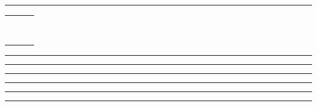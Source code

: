 
\hfill{\bfseries\Huge\MyYear}\par
\nointerlineskip\vspace{0.5em}
\rule{\textwidth}{1pt}

\nointerlineskip\vspace{0.5em}

\begin{tabular*}{\textwidth}{@{}>{\bfseries}c@{\extracolsep\fill}>{\bfseries}c@{\extracolsep\fill}>{\bfseries}c@{}}
	\MonthNameRowYC{\January}{\February}{\March}    \\
	\MonthTblYC{\MonthTblJan}  & \MonthTblYC{\MonthTblFeb}  & \MonthTblYC{\MonthTblMar} \\
	\MonthNameRowYC{\April}{\May}{\June}            \\
	\MonthTblYC{\MonthTblApr}  & \MonthTblYC{\MonthTblMay}  & \MonthTblYC{\MonthTblJun} \\
	\MonthNameRowYC{\July}{\August}{\September}     \\
	\MonthTblYC{\MonthTblJul}  & \MonthTblYC{\MonthTblAug}  & \MonthTblYC{\MonthTblSep} \\
	\MonthNameRowYC{\October}{\November}{\December} \\
	\MonthTblYC{\MonthTblOct}  & \MonthTblYC{\MonthTblNov}  & \MonthTblYC{\MonthTblDec}
\end{tabular*}

\vspace{2em}
{\color{WriteBgMain}
\rule{\textwidth}{1pt}\par
\rule{\textwidth}{1pt}\par
\rule{\textwidth}{1pt}\par
\rule{\textwidth}{1pt}\par
\rule{\textwidth}{1pt}\par
\rule{\textwidth}{1pt}\par}

